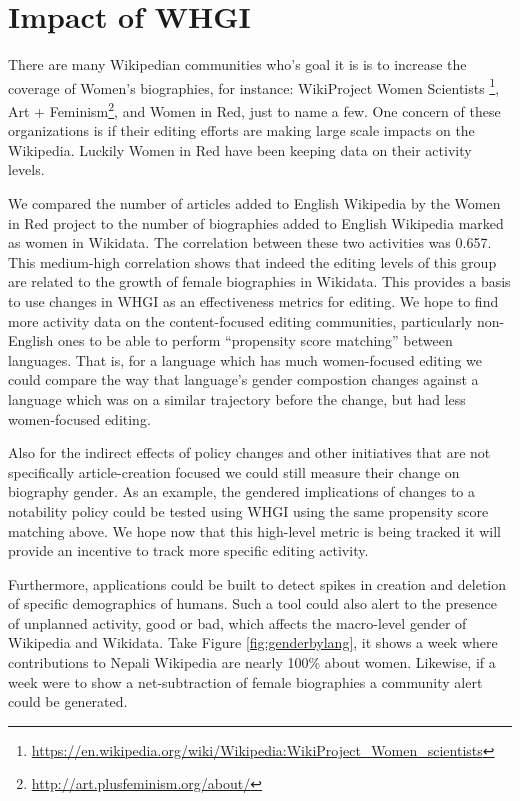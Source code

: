 \documentclass{sig-alternate-05-2015}
\begin{document}
\section{Impact of WHGI}
There are many Wikipedian communities who's goal it is is to increase the coverage of Women's biographies, for instance: WikiProject Women Scientists \footnote{\url{https://en.wikipedia.org/wiki/Wikipedia:WikiProject_Women_scientists}}, Art + Feminism\footnote{\url{http://art.plusfeminism.org/about/}}, and Women in Red, just to name a few. One concern of these organizations is if their editing efforts are making large scale impacts on the Wikipedia. Luckily Women in Red have been keeping data on their activity levels.

We compared the number of articles added to English Wikipedia by the Women in Red project to the number of biographies added to English Wikipedia marked as women in Wikidata. The correlation between these two activities was 0.657. This medium-high correlation shows that indeed the editing levels of this group are related to the growth of female biographies in Wikidata. This provides a basis to use changes in WHGI as an effectiveness metrics for editing. We hope to find more activity data on the content-focused editing communities, particularly non-English ones to be able to perform ``propensity score matching'' between languages. That is, for a language which has much women-focused editing we could compare the way that language's gender compostion changes against a language which was on a similar trajectory before the change, but had less women-focused editing.

Also for the indirect effects of policy changes and other initiatives that are not specifically article-creation focused we could still measure their change on biography gender. As an example, the gendered implications of changes to a notability policy could be tested using WHGI using the same propensity score matching above. We hope now that this high-level metric is being tracked it will provide an incentive to track more specific editing activity.

Furthermore, applications could be built to detect spikes in creation and deletion of specific demographics of humans. Such a tool could also alert to the presence of unplanned activity, good or bad, which affects the macro-level gender of Wikipedia and Wikidata. Take Figure \ref{fig:genderbylang}, it shows a week where contributions to Nepali Wikipedia are nearly 100\% about women. Likewise, if a week were to show a net-subtraction of female biographies  a community alert could be generated. 
\end{document}
